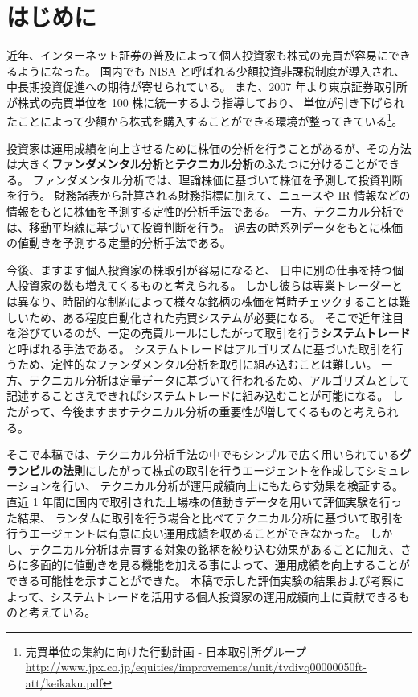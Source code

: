 \documentclass[twocolumn,jsaiac]{jarticle}
\title{
    \jtitle{テクニカル分析の効果を検証する}
}
\author{
    \jname{37-147308 飯塚 修平}
}
\begin{document}
\maketitle
\section{はじめに}
近年、インターネット証券の普及によって個人投資家も株式の売買が容易にできるようになった。
国内でも NISA と呼ばれる少額投資非課税制度が導入され、中長期投資促進への期待が寄せられている\cite{nisa}。
また、2007 年より東京証券取引所が株式の売買単位を 100 株に統一するよう指導しており、
単位が引き下げられたことによって少額から株式を購入することができる環境が整ってきている\footnote{
  売買単位の集約に向けた行動計画 - 日本取引所グループ \url{http://www.jpx.co.jp/equities/improvements/unit/tvdivq00000050ft-att/keikaku.pdf}}。

投資家は運用成績を向上させるために株価の分析を行うことがあるが、その方法は大きく{\bf ファンダメンタル分析}と{\bf テクニカル分析}のふたつに分けることができる。
ファンダメンタル分析では、理論株価に基づいて株価を予測して投資判断を行う。
財務諸表から計算される財務指標に加えて、ニュースや IR 情報などの情報をもとに株価を予測する定性的分析手法である。
一方、テクニカル分析では、移動平均線に基づいて投資判断を行う。
過去の時系列データをもとに株価の値動きを予測する定量的分析手法である\cite{ga}。

今後、ますます個人投資家の株取引が容易になると、
日中に別の仕事を持つ個人投資家の数も増えてくるものと考えられる。
しかし彼らは専業トレーダーとは異なり、時間的な制約によって様々な銘柄の株価を常時チェックすることは難しいため、ある程度自動化された売買システムが必要になる。
そこで近年注目を浴びているのが、一定の売買ルールにしたがって取引を行う{\bf システムトレード}と呼ばれる手法である\cite{short}。
システムトレードはアルゴリズムに基づいた取引を行うため、定性的なファンダメンタル分析を取引に組み込むことは難しい。
一方、テクニカル分析は定量データに基づいて行われるため、アルゴリズムとして記述することさえできればシステムトレードに組み込むことが可能になる。
したがって、今後ますますテクニカル分析の重要性が増してくるものと考えられる。

そこで本稿では、テクニカル分析手法の中でもシンプルで広く用いられている{\bf グランビルの法則}にしたがって株式の取引を行うエージェントを作成してシミュレーションを行い、
テクニカル分析が運用成績向上にもたらす効果を検証する。
直近 1 年間に国内で取引された上場株の値動きデータを用いて評価実験を行った結果、
ランダムに取引を行う場合と比べてテクニカル分析に基づいて取引を行うエージェントは有意に良い運用成績を収めることができなかった。
しかし、テクニカル分析は売買する対象の銘柄を絞り込む効果があることに加え、さらに多面的に値動きを見る機能を加える事によって、運用成績を向上することができる可能性を示すことができた。
本稿で示した評価実験の結果および考察によって、システムトレードを活用する個人投資家の運用成績向上に貢献できるものと考えている。
\end{document}

